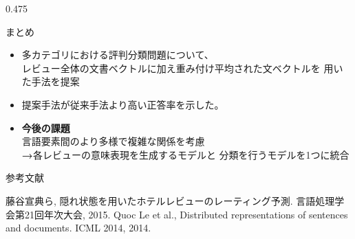 \documentclass[unicode,10pt]{beamer}
\newcommand{\arrow}{\textcolor{ttiblue}{\textbf{→}}\hspace{1ex}}
\newcommand{\itemtitle}[1]{\textbf{#1}\\}
\newcommand{\columnsize}{0.475\textwidth}
\begin{document}
\begin{frame}
\begin{columns}[onlytextwidth,t]
\begin{column}{\columnsize}
  \begin{block}{まとめ}
    \begin{itemize}
      \item 多カテゴリにおける評判分類問題について、\\
            レビュー全体の文書ベクトルに加え重み付け平均された文ベクトルを
            用いた手法を提案
      \item 提案手法が従来手法\cite{fujitani15}より高い正答率を示した。
      \item \itemtitle{今後の課題}
            言語要素間のより多様で複雑な関係を考慮 \\
            \arrow 各レビューの意味表現を生成するモデルと
                   分類を行うモデルを1つに統合 \\
    \end{itemize}
  \end{block}

  参考文献
  
  \begin{thebibliography}{9}
    藤谷宣典ら,
    隠れ状態を用いたホテルレビューのレーティング予測.
    言語処理学会第21回年次大会, 2015.
    Quoc Le et al.,
    Distributed representations of sentences and documents.
    ICML 2014, 2014.
  \end{thebibliography}
\end{column}

\end{columns}
\end{frame}
\end{document}
